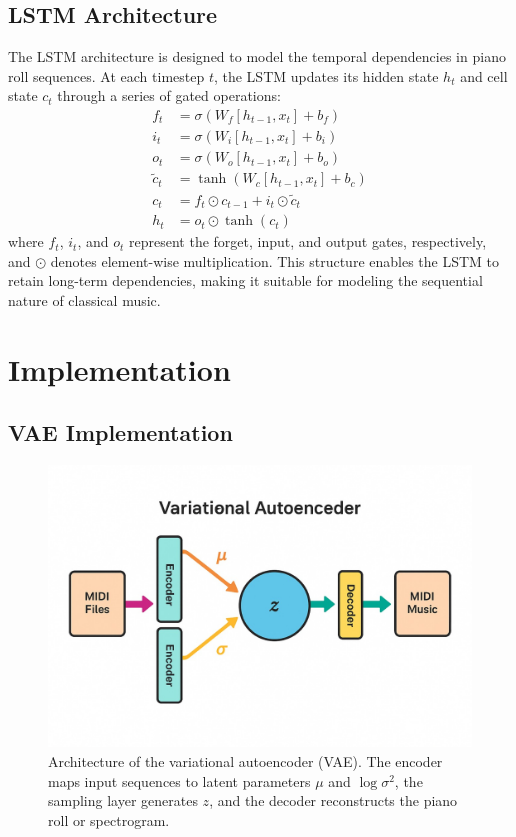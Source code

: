 \documentclass[conference]{IEEEtran}
\begin{document}
\subsection{LSTM Architecture}
The LSTM architecture is designed to model the temporal dependencies in piano roll sequences. At each timestep $t$, the LSTM updates its hidden state $h_t$ and cell state $c_t$ through a series of gated operations:
\begin{equation}
\begin{aligned}
f_t &= \sigma(W_f [h_{t-1}, x_t] + b_f) \\
i_t &= \sigma(W_i [h_{t-1}, x_t] + b_i) \\
o_t &= \sigma(W_o [h_{t-1}, x_t] + b_o) \\
\tilde{c}_t &= \tanh(W_c [h_{t-1}, x_t] + b_c) \\
c_t &= f_t \odot c_{t-1} + i_t \odot \tilde{c}_t \\
h_t &= o_t \odot \tanh(c_t)
\end{aligned}
\end{equation}
where $f_t$, $i_t$, and $o_t$ represent the forget, input, and output gates, respectively, and $\odot$ denotes element-wise multiplication. This structure enables the LSTM to retain long-term dependencies, making it suitable for modeling the sequential nature of classical music.

\section{Implementation}
\label{sec:implementation}

\subsection{VAE Implementation}
\begin{figure}[h]
    \centering
    \includegraphics[width=\linewidth]{vae_architecture.jpg}
    \caption{Architecture of the variational autoencoder (VAE). The encoder maps input sequences to latent parameters $\mu$ and $\log\sigma^2$, the sampling layer generates $z$, and the decoder reconstructs the piano roll or spectrogram.}
    \label{fig:vae_arch}
\end{figure}
\end{document}
